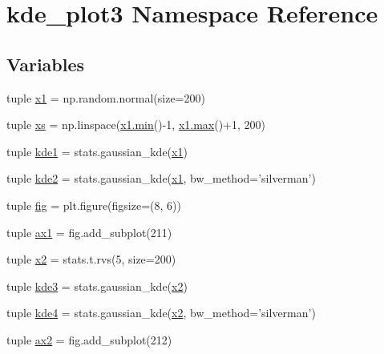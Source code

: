 \hypertarget{namespacekde__plot3}{}\section{kde\+\_\+plot3 Namespace Reference}
\label{namespacekde__plot3}
\subsection*{Variables}
\begin{DoxyCompactItemize}
\item 
tuple \hyperlink{namespacekde__plot3_a47b4fbdfb27208bb6d4f3a0f0963b9e3}{x1} = np.\+random.\+normal(size=200)
\item 
tuple \hyperlink{namespacekde__plot3_a379d691198eaa6313ae4e5158b5d6b79}{xs} = np.\+linspace(\hyperlink{vecbfn_8cc_aa3e27e02424d28adfcf9d2b934e741a1}{x1.\+min}()-\/1, \hyperlink{vecbfn_8cc_a71f214d4a304fdc2089c54dbaf979fe5}{x1.\+max}()+1, 200)
\item 
tuple \hyperlink{namespacekde__plot3_aaa233999b8dcc57c0fd06941b4f8df28}{kde1} = stats.\+gaussian\+\_\+kde(\hyperlink{namespacekde__plot3_a47b4fbdfb27208bb6d4f3a0f0963b9e3}{x1})
\item 
tuple \hyperlink{namespacekde__plot3_affd6aafd4a735d04fcd04d2687b1e5d0}{kde2} = stats.\+gaussian\+\_\+kde(\hyperlink{namespacekde__plot3_a47b4fbdfb27208bb6d4f3a0f0963b9e3}{x1}, bw\+\_\+method='silverman')
\item 
tuple \hyperlink{namespacekde__plot3_ad3eed5c2e7bd3871301ec48833564243}{fig} = plt.\+figure(figsize=(8, 6))
\item 
tuple \hyperlink{namespacekde__plot3_ab0d9f7bca54981c3c97090060dba30f5}{ax1} = fig.\+add\+\_\+subplot(211)
\item 
tuple \hyperlink{namespacekde__plot3_ad482b5dee3dc21bce5fabc6ece7e9d96}{x2} = stats.\+t.\+rvs(5, size=200)
\item 
tuple \hyperlink{namespacekde__plot3_a6dcf138f4a61bb8402a2533abea1de40}{kde3} = stats.\+gaussian\+\_\+kde(\hyperlink{namespacekde__plot3_ad482b5dee3dc21bce5fabc6ece7e9d96}{x2})
\item 
tuple \hyperlink{namespacekde__plot3_aec3aad5f83254bf1196b6ee3e0d9720e}{kde4} = stats.\+gaussian\+\_\+kde(\hyperlink{namespacekde__plot3_ad482b5dee3dc21bce5fabc6ece7e9d96}{x2}, bw\+\_\+method='silverman')
\item 
tuple \hyperlink{namespacekde__plot3_af46ce103d8b1f2d25d0ac0244a485328}{ax2} = fig.\+add\+\_\+subplot(212)
\end{DoxyCompactItemize}


